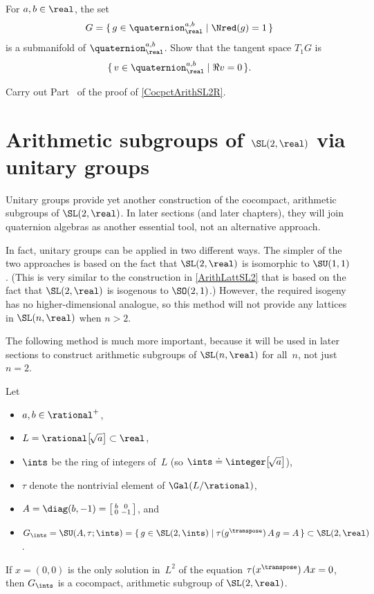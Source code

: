 \begin{exercises}
\item \label{T1(Nred=1)}
 For $a,b \in \real$, the set
 $$ G = \{\, g \in \quaternion^{a,b}_\real \mid \Nred(g) = 1 \,\} $$ 
 is a submanifold of $\quaternion^{a,b}_\real$. Show that the
tangent space $T_1 G$ is
 $$ \{\, v \in \quaternion^{a,b}_\real \mid \Re v = 0 \,\} .$$

\item \label{ArithSO21->QuatF}
 Carry out Part~ of the proof of \cref{CocpctArithSL2R}.

\end{exercises}





\section{Arithmetic subgroups of \texorpdfstring{$\SL(2,\real)$}{SL(2,R)} via unitary groups}

Unitary groups provide yet another construction of the cocompact, arithmetic subgroups of $\SL(2,\real)$. In later sections (and later chapters), they will join quaternion algebras as another essential tool, not an alternative approach.

In fact, unitary groups can be applied in two different ways.
The simpler of the two approaches is based on the fact that $\SL(2,\real)$ is isomorphic to $\SU(1,1)$ . (This is very similar to the construction in \cref{ArithLattSL2} that is based on the fact that $\SL(2,\real)$ is isogenous to $\SO(2,1)$.) However, the required isogeny has no higher-dimensional analogue, so this method will not provide any lattices in $\SL(n,\real)$ when $n > 2$.

The following method is much more important, because it will be used in later sections to construct arithmetic subgroups of $\SL(n,\real)$ for all~$n$, not just $n = 2$.

\begin{eg} \label{SU2QCocpct}
Let
	\begin{itemize}
	\item $a,b \in \rational^+$,
	\item $L = \rational \bigl[\! \sqrt{a} \bigr] \subset \real$,
	\item $\ints$ be the ring of integers of~$L$ (so $\ints \doteq \integer\bigl[\! \sqrt{a}\bigr]$),
	\item $\tau$ denote the nontrivial element of $\Gal(L/\rational)$,
	\item $A = \diag(b,-1) = \left[\begin{smallmatrix} b & 0 \\ 0 & -1 \end{smallmatrix}\right]$,
	and
	\item $G_\ints = \SU( A, \tau ; \ints ) = \{\, g \in \SL(2,\ints) \mid \tau(g^\transpose) \, A \, g = A \,\} \subset \SL(2,\real)$.
	\end{itemize}
If $ x = (0,0)$ is the only solution in~$L^2$ of the equation $\tau( x{}^\transpose) \, A  x = 0$, then $G_\ints$ is a cocompact, arithmetic subgroup of $\SL(2,\real)$.
\end{eg}

